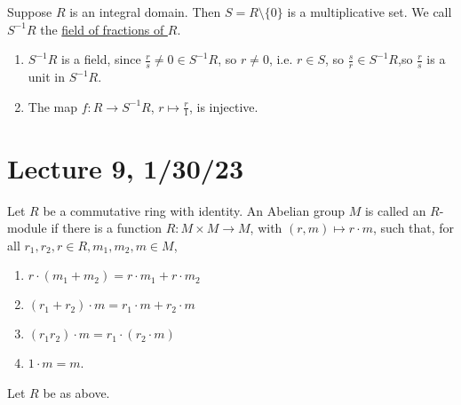 \documentclass[x11names,reqno,14pt]{extarticle}
\begin{document}
Suppose $R$ is an integral domain. Then $S = R\setminus\{0\}$ is a multiplicative set. We call $S^{-1}R$ the \underline{field of fractions of $R$}. 

\begin{enumerate}

\item $S^{-1}R$ is a field, since $\frac{r}{s}\neq0 \in S^{-1}R$, so $r\neq0$, i.e. $r \in S$, so $\frac{s}{r} \in S^{-1}R$,so $\frac{r}{s}$ is a unit in $S^{-1}R$. 

\item The map $f:R\to S^{-1}R$, $r \mapsto \frac{r}{1}$, is injective. 

\end{enumerate}

\section*{Lecture 9, 1/30/23}


Let $R$ be a commutative ring with identity. An Abelian group $M$ is called an $R$-module if there is a function $R:M\times M\to M$, with $(r, m)\mapsto r\cdot m$, such that, for all $r_1, r_2, r \in R, m_1, m_2, m \in M$, 
\begin{enumerate}

\item $r\cdot(m_1 + m_2) = r\cdot m_1 + r\cdot m_2$ 

\item $(r_1 + r_2)\cdot m = r_1\cdot m + r_2 \cdot m$ 

\item $(r_1r_2)\cdot m = r_1\cdot(r_2\cdot m)$

\item $1\cdot m = m$. 

\end{enumerate}

\exm

Let $R$ be as above. 
\end{document}
